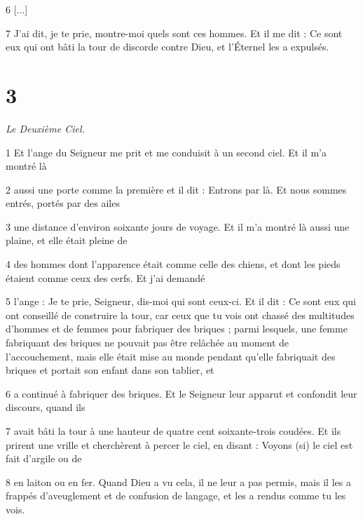 \par 6 [...]

\par 7 J'ai dit, je te prie, montre-moi quels sont ces hommes. Et il me dit : Ce sont eux qui ont bâti la tour de discorde contre Dieu, et l'Éternel les a expulsés.

\chapter{3}

\par \textit{Le Deuxième Ciel.}

\par 1 Et l'ange du Seigneur me prit et me conduisit à un second ciel. Et il m'a montré là

\par 2 aussi une porte comme la première et il dit : Entrons par là. Et nous sommes entrés, portés par des ailes

\par 3 une distance d'environ soixante jours de voyage. Et il m'a montré là aussi une plaine, et elle était pleine de

\par 4 des hommes dont l'apparence était comme celle des chiens, et dont les pieds étaient comme ceux des cerfs. Et j'ai demandé

\par 5 l'ange : Je te prie, Seigneur, dis-moi qui sont ceux-ci. Et il dit : Ce sont eux qui ont conseillé de construire la tour, car ceux que tu vois ont chassé des multitudes d'hommes et de femmes pour fabriquer des briques ; parmi lesquels, une femme fabriquant des briques ne pouvait pas être relâchée au moment de l'accouchement, mais elle était mise au monde pendant qu'elle fabriquait des briques et portait son enfant dans son tablier, et

\par 6 a continué à fabriquer des briques. Et le Seigneur leur apparut et confondit leur discours, quand ils

\par 7 avait bâti la tour à une hauteur de quatre cent soixante-trois coudées. Et ils prirent une vrille et cherchèrent à percer le ciel, en disant : Voyons (si) le ciel est fait d'argile ou de

\par 8 en laiton ou en fer. Quand Dieu a vu cela, il ne leur a pas permis, mais il les a frappés d'aveuglement et de confusion de langage, et les a rendus comme tu les vois.

